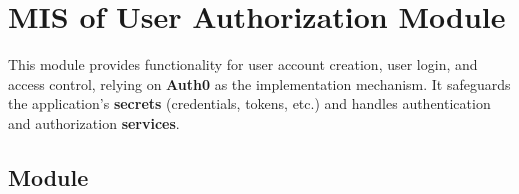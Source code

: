 \documentclass[12pt, titlepage]{article}
\begin{document}







\section{MIS of User Authorization Module} \label{AuthModule}

This module provides functionality for user account creation, user login, and
access control, relying on \textbf{Auth0} as the implementation mechanism. It
safeguards the application’s \textbf{secrets} (credentials, tokens, etc.) and
handles authentication and authorization \textbf{services}.

\subsection{Module}
\end{document}
